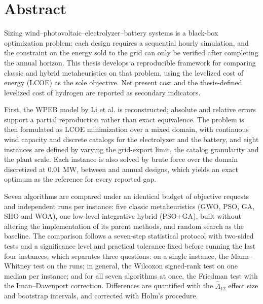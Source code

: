 \chapter*{Abstract}
\noindent

Sizing wind--photovoltaic--electrolyzer--battery systems is a black-box optimization problem: each design requires a sequential hourly simulation, and the constraint on the energy sold to the grid can only be verified after completing the annual horizon. This thesis develops a reproducible framework for comparing classic and hybrid metaheuristics on that problem, using the levelized cost of energy (LCOE) as the sole objective. Net present cost and the thesis-defined levelized cost of hydrogen are reported as secondary indicators.

First, the WPEB model by Li et al. \cite{Li2024WPEB} is reconstructed; absolute and relative errors support a partial reproduction rather than exact equivalence. The problem is then formulated as LCOE minimization over a mixed domain, with continuous wind capacity and discrete catalogs for the electrolyzer and the battery, and eight instances are defined by varying the grid-export limit, the catalog granularity and the plant scale. Each instance is also solved by brute force over the domain discretized at 0.01 MW, between \BFEDesignsEn{} and \BFCDesignsEn{} annual designs, which yields an exact optimum as the reference for every reported gap.

Seven algorithms are compared under an identical budget of \RequestsPerRun{} objective requests and \Replicates{} independent runs per instance: five classic metaheuristics (GWO, PSO, GA, SHO and WOA), one low-level integrative hybrid (PSO+GA), built without altering the implementation of its parent methods, and random search as the baseline. The comparison follows a seven-step statistical protocol with two-sided tests and a significance level and practical tolerance fixed before running the last four instances, which separates three questions: on a single instance, the Mann--Whitney test on the runs; in general, the Wilcoxon signed-rank test on one median per instance; and for all seven algorithms at once, the Friedman test with the Iman--Davenport correction. Differences are quantified with the $\hat{A}_{12}$ effect size and bootstrap intervals, and corrected with Holm's procedure.

